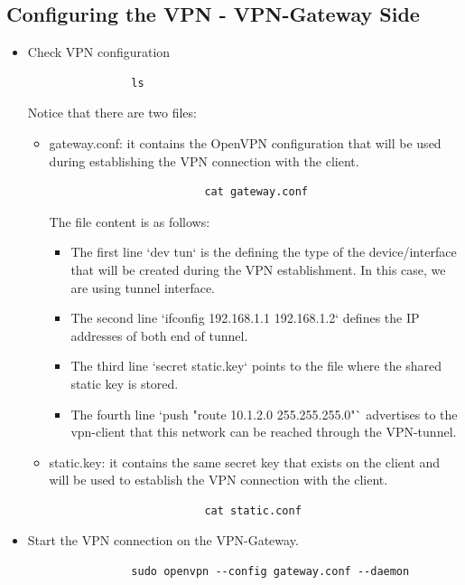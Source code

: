 \subsection{Configuring the VPN - VPN-Gateway Side}
\begin{itemize}
	\item Check VPN configuration

		\begin{verbatim}
				ls
		\end{verbatim}

		Notice that there are two files:

		\begin{itemize}
			\item gateway.conf: it contains the OpenVPN  configuration that will be used during establishing the VPN connection with the client.
				\begin{verbatim}
						cat gateway.conf
				\end{verbatim}

				The file content is as follows:
					\begin{itemize}
						\item The first line `dev tun` is the defining the type of the device/interface that will be created during the VPN establishment. In this case, we are using tunnel interface.
						\item The second line `ifconfig 192.168.1.1 192.168.1.2` defines the IP addresses of both end of tunnel.
						\item The third line `secret static.key` points to the file where the shared static key is stored.
						\item The fourth line `push "route 10.1.2.0 255.255.255.0"` advertises to the vpn-client that this network can be reached through the VPN-tunnel.
					\end{itemize}
			\item static.key: it contains the same secret key that exists on the client and will be used to establish the VPN connection with the client.
				\begin{verbatim}
						cat static.conf
				\end{verbatim}

		\end{itemize}

	\item Start the VPN connection on the VPN-Gateway.
		\begin{verbatim}
				sudo openvpn --config gateway.conf --daemon
		\end{verbatim}
\end{itemize}

